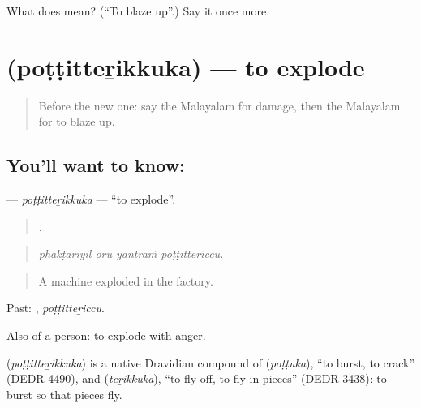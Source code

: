 \begin{tcolorbox}[breakable,colback=teal!4,colframe=teal!35!black,title={Before you move on}]
What does  mean? (\textquotedblleft{}To blaze up\textquotedblright{}.) Say it once more.
\end{tcolorbox}
\section[\texorpdfstring{\ml{പൊട്ടിത്തെറിക്കുക} (poṭṭitteṟikkuka)}{പൊട്ടിത്തെറിക്കുക (poṭṭitteṟikkuka)}]{ (poṭṭitteṟikkuka) — to explode}

\label{lesson:ML-C363-pottitterikkuka}



\begin{quote}
Before the new one: say the Malayalam for damage, then the Malayalam for to blaze up.
\end{quote}

\subsection*{You'll want to know: }
\textbf{} — \emph{poṭṭitteṟikkuka} — \textquotedblleft{}to explode\textquotedblright{}.

\begin{quote}
   .
\end{quote}

\begin{quote}
\emph{phākṭaṟiyil oru yantraṁ poṭṭitteṟiccu.}
\end{quote}

\begin{quote}
A machine exploded in the factory.
\end{quote}

Past: , \emph{poṭṭitteṟiccu}.

Also of a person: to explode with anger.

\begin{cousinweb}
\textbf{} (\emph{poṭṭitteṟikkuka}) is a native Dravidian compound of  (\emph{poṭṭuka}), \textquotedblleft{}to burst, to crack\textquotedblright{} (DEDR 4490), and  (\emph{teṟikkuka}), \textquotedblleft{}to fly off, to fly in pieces\textquotedblright{} (DEDR 3438): to burst so that pieces fly.
\end{cousinweb}


